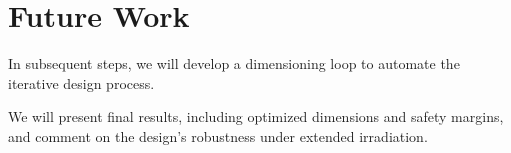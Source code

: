 
\section{Future Work}
In subsequent steps, we will develop a dimensioning loop to automate the iterative design process.

We will present final results, including optimized dimensions and safety margins, and comment on the design's robustness under extended irradiation.
